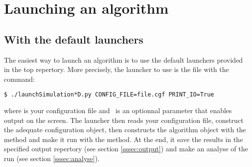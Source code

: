 
\section{Launching an algorithm\label{ssec:launch-algo}}
\noindent

    \subsection{With the default launchers}
    \noindent

        The easiest way to launch an algorithm is to use the default launchers provided in the top repertory.
        More precisely, the launcher to use is the \python file  with the command:
        \lstset{style=codebash}
        \begin{lstlisting}
$ ./launchSimulation*D.py CONFIG_FILE=file.cgf PRINT_IO=True\end{lstlisting}
        where  is
        your configuration file and  is an optionnal parameter that enables output on the screen.
        The launcher then reads your configuration file, construct the adequate configuration object, then constructs
        the algorithm object with the  method and make it run with the  method.
        At the end, it save the results in the specified output repertory (see section \ref{sssec:output}) and make an analyse of the
        run (see section \ref{sssec:analyse}).\\

